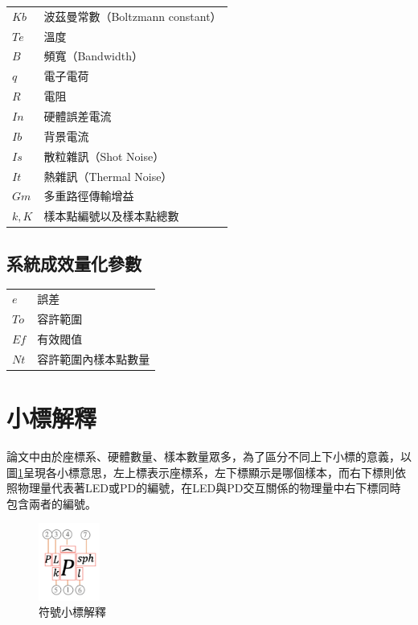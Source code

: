 \begin{longtable}[l]{ll}
    $Kb$&波茲曼常數（Boltzmann constant）\\
    $Te$& 溫度\\
    $B$& 頻寬（Bandwidth）\\
    $q$&電子電荷\\
    $R$&電阻\\
    $In$&硬體誤差電流\\
    $Ib$&背景電流\\
    $Is$&散粒雜訊（Shot Noise）\\
    $It$&熱雜訊（Thermal Noise）\\
    $Gm$&多重路徑傳輸增益\\
    $k,K$&樣本點編號以及樣本點總數\\
\end{longtable}


\onehalfspacing

\subsection*{系統成效量化參數}

\begin{longtable}[l]{ll}
    $e$&誤差\\
    $To$&容許範圍\\
    $Ef$&有效閥值\\
    $Nt$&容許範圍內樣本點數量\\
\end{longtable}




\onehalfspacing

\section*{小標解釋}

論文中由於座標系、硬體數量、樣本數量眾多，為了區分不同上下小標的意義，以圖\ref{pic:symbol}呈現各小標意思，左上標表示座標系，左下標顯示是哪個樣本，而右下標則依照物理量代表著LED或PD的編號，在LED與PD交互關係的物理量中右下標同時包含兩者的編號。

\begin{figure}[ht]
	\centering
	\includegraphics[width=2cm]{ch1pic/not_whole.png}
    \caption{符號小標解釋}
    \label{pic:symbol}
\end{figure}



